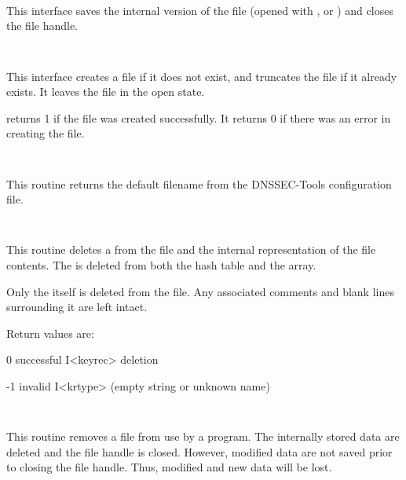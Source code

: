 \begin{description}
\item {}\verb" "

This interface saves the internal version of the  file (opened
with ,  or )
and closes the file handle.

\item {}\verb" "

This interface creates a  file if it does not exist, and
truncates the file if it already exists.  It leaves the file in the open
state.

 returns 1 if the file was created successfully.  It
returns 0 if there was an error in creating the file.

\item {}\verb" "

This routine returns the default  filename from the
DNSSEC-Tools configuration file.

\item {}\verb" "

This routine deletes a  from the  file and the
internal representation of the file contents.  The  is deleted
from both the  hash table and the \var{\@keyreclines} array.

Only the  itself is deleted from the file.  Any associated
comments and blank lines surrounding it are left intact.

Return values are:

\begin{description}
\item 0 successful I<keyrec> deletion
\item -1 invalid I<krtype> (empty string or unknown name)
\end{description}

\item {}\verb" "

This routine removes a  file from use by a program.  The
internally stored data are deleted and the  file handle is
closed.  However, modified data are not saved prior to closing the file
handle.  Thus, modified and new data will be lost.

\item {}\verb" "


\end{description}
